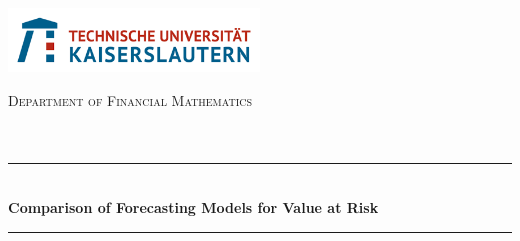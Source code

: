 \begin{titlepage}
	

\newcommand{\HRule}{\rule{\linewidth}{0.5mm}} %

\center %
 
\begin{minipage}[b]{0.4\textwidth}
	\begin{center}
		\includegraphics[width=0.5\textwidth]{figures/download}\\[1cm] %
	\end{center}
\end{minipage}
\vspace{1.5cm}



\textsc{\LARGE Department of Financial Mathematics}\\[1.5cm] %
\textsc{\Large }\\[0.5cm] %
\textsc{\large }\\[0.5cm] %


\HRule \\[0.5cm]
{ \huge \bfseries Comparison of Forecasting Models for Value at Risk}\\[0.1cm] %
\HRule \\[1.5cm]
\vspace{2.5cm}
 



\end{titlepage}
